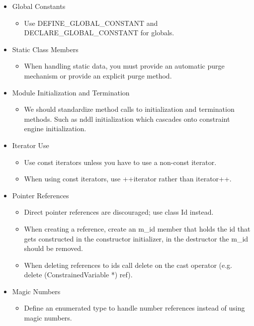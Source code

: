 \documentclass[10pt, letterpaper, twoside]{article}
\begin{document}
\begin{itemize}
\item[] Global Constants
 \begin{itemize}
  \item	Use DEFINE\_GLOBAL\_CONSTANT and DECLARE\_GLOBAL\_CONSTANT for globals.
 \end{itemize}

\item[] Static Class Members
 \begin{itemize}
  \item	When handling static data, you must provide an automatic purge mechanism or provide an explicit purge method.
 \end{itemize}

\item[] Module Initialization and Termination
 \begin{itemize}
  \item	We should standardize method calls to initialization and termination methods.  Such as nddl initialization which cascades onto constraint engine initialization.
 \end{itemize}

\item[] Iterator Use
 \begin{itemize}	 
  \item	 Use const iterators unless you have to use a non-const iterator. 
  \item	 When using const iterators, use ++iterator rather than iterator++.
 \end{itemize}

\item[] Pointer References
 \begin{itemize}	
  \item	Direct pointer references are discouraged; use class Id instead.
  \item	When creating a reference, create an m\_id member that holds the id that gets constructed in the constructor initializer, in the destructor the m\_id should be removed.
  \item	When deleting references to ids call delete on the cast operator (e.g. delete (ConstrainedVariable *) ref).
 \end{itemize}

\item[] Magic Numbers
 \begin{itemize}      
  \item	Define an enumerated type to handle number references instead of using magic numbers.
 \end{itemize}


\end{itemize}
\end{document}
